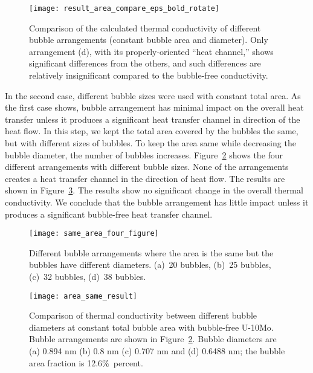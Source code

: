 \begin{figure}
	\centering
	\texttt{[image: result\_area\_compare\_eps\_bold\_rotate]}
    \caption{Comparison of the calculated thermal conductivity of different
        bubble arrangements (constant bubble area and diameter). Only
        arrangement (d), with its properly-oriented ``heat channel,'' shows significant
        differences from the others, and such differences are relatively
        insignificant compared to the bubble-free conductivity.}
	\label{fig:five_results}
\end{figure}

In the second case, different bubble sizes were used with constant total area. As the first case shows, bubble arrangement has minimal impact on the overall heat transfer unless it produces a significant heat transfer channel in direction of the heat flow. In this step, we kept the total area covered by the bubbles the same, but with different sizes of bubbles. To keep the area same while decreasing the bubble diameter, the number of bubbles increases. Figure~\ref{fig:area_same_four} shows the four different arrangements with different bubble sizes. None of the arrangements creates a heat transfer channel in the direction of heat flow. The results are shown in Figure~\ref{fig:four_results}. The results show no significant change in the overall thermal conductivity. We conclude that the bubble arrangement has little impact unless it produces a significant bubble-free heat transfer channel. 

 
\begin{figure}
	\centering
	\texttt{[image: same\_area\_four\_figure]}
    \caption{Different bubble arrangements where the area is the same but the
      bubbles have different diameters. (a)~20 bubbles, (b)~25 bubbles,
      (c)~32 bubbles, (d)~38 bubbles.}
	\label{fig:area_same_four}
\end{figure}
\begin{figure}
	\centering
	\texttt{[image: area\_same\_result]}
	\caption{Comparison of thermal conductivity between different bubble 
      diameters at constant total bubble area with bubble-free U-10Mo. Bubble
      arrangements are shown in Figure~\ref{fig:area_same_four}.
      Bubble diameters are (a) 0.894 nm (b) 0.8 nm (c) 0.707 nm and (d) 0.6488 nm;
      the bubble area fraction is 12.6$\%$~percent.}
	\label{fig:four_results}
\end{figure}

